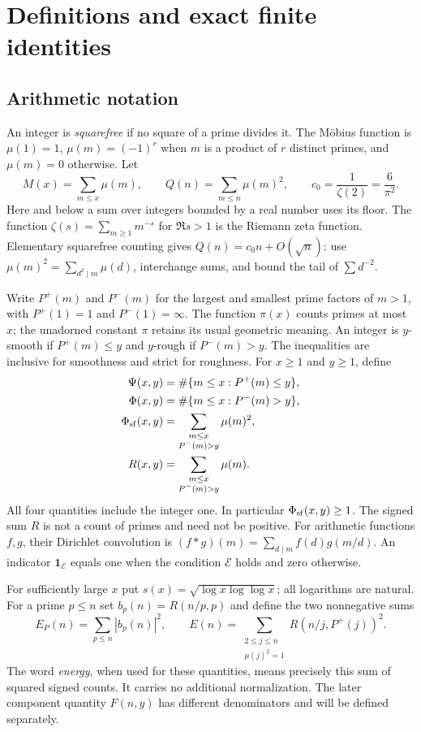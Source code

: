 \section{Definitions and exact finite identities}\label{sec:definitions}

\subsection{Arithmetic notation}

An integer is \emph{squarefree} if no square of a prime divides it. The M\"obius function is $\mu(1)=1$, $\mu(m)=(-1)^r$ when $m$ is a product of $r$ distinct primes, and $\mu(m)=0$ otherwise. Let
\[
 M(x)=\sum_{m\le x}\mu(m),\qquad
 Q(n)=\sum_{m\le n}\mu(m)^2,\qquad c_0=\frac1{\zeta(2)}=\frac6{\pi^2}.
\]
Here and below a sum over integers bounded by a real number uses its floor. The function $\zeta(s)=\sum_{m\ge1}m^{-s}$ for $\Re s>1$ is the Riemann zeta function. Elementary squarefree counting gives $Q(n)=c_0n+O(\sqrt n)$: use $\mu(m)^2=\sum_{d^2\mid m}\mu(d)$, interchange sums, and bound the tail of $\sum d^{-2}$.

Write $P^+(m)$ and $P^-(m)$ for the largest and smallest prime factors of $m>1$, with $P^+(1)=1$ and $P^-(1)=\infty$. The function $\pi(x)$ counts primes at most $x$; the unadorned constant $\pi$ retains its usual geometric meaning. An integer is $y$-smooth if $P^+(m)\le y$ and $y$-rough if $P^-(m)>y$. The inequalities are inclusive for smoothness and strict for roughness. For $x\ge1$ and $y\ge1$, define
\begin{align}
 \Psi(x,y)&=\#\{m\le x:P^+(m)\le y\},\notag\\
 \Phi(x,y)&=\#\{m\le x:P^-(m)>y\},\notag\\
 \Phi_{\mathrm{sf}}(x,y)&=\sum_{\substack{m\le x\\P^-(m)>y}}\mu(m)^2,\label{def:counts}\\
 R(x,y)&=\sum_{\substack{m\le x\\P^-(m)>y}}\mu(m).\notag
\end{align}
All four quantities include the integer one. In particular $\Phi_{\mathrm{sf}}(x,y)\ge1$. The signed sum $R$ is not a count of primes and need not be positive. For arithmetic functions $f,g$, their Dirichlet convolution is $(f*g)(m)=\sum_{d\mid m}f(d)g(m/d)$. An indicator $\mathbf1_{\mathcal E}$ equals one when the condition $\mathcal E$ holds and zero otherwise.

For sufficiently large $x$ put $s(x)=\sqrt{\log x\log\log x}$; all logarithms are natural. For a prime $p\le n$ set $b_p(n)=R(n/p,p)$ and define the two nonnegative sums
\begin{equation}\label{def:energies}
 E_P(n)=\sum_{p\le n}|b_p(n)|^2,\qquad
 E(n)=\sum_{\substack{2\le j\le n\\\mu(j)^2=1}}
          R(n/j,P^+(j))^2.
\end{equation}
The word \emph{energy}, when used for these quantities, means precisely this sum of squared signed counts. It carries no additional normalization. The later component quantity $F(n,y)$ has different denominators and will be defined separately.

